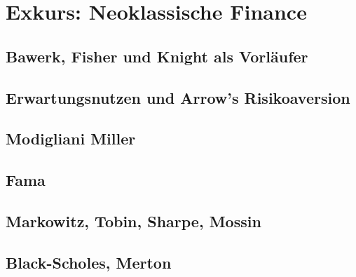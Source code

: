 %
%
%

\chapter{Exkurs: Neoklassische Finance}
\label{Finance}

\section{Bawerk, Fisher und Knight als Vorläufer} \label{FisherundKnight}

\section{Erwartungsnutzen und Arrow's Risikoaversion}

\section{Modigliani Miller}

\section{Fama}

\section{Markowitz, Tobin, Sharpe, Mossin}

\section{Black-Scholes, Merton}


